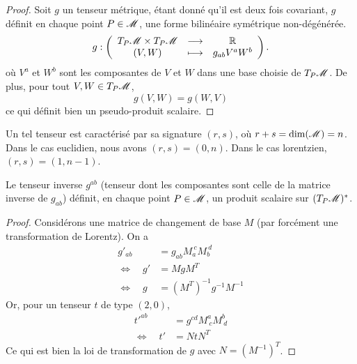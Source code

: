 \documentclass[a4paper,11pt]{report}
\begin{document}
                \begin{proof}
                    Soit $g$ un tenseur métrique, étant donné qu'il est deux fois covariant, $g$ définit en chaque point $P\in\mathscr{M}$, une forme bilinéaire symétrique non-dégénérée.
                \begin{equation}
                    g:\left(
                \begin{array}{ccc}
                    T_P\mathscr{M}\times T_P\mathscr{M} & \longrightarrow & \mathbb{R} \\
                    (V,W) & \longmapsto & g_{ab}V^a W^b
                \end{array}
                \right).
                \end{equation}
                où $V^a$ et $W^b$ sont les composantes de $V$ et $W$ dans une base choisie de $T_P\mathscr{M}$. De plus, pour tout $V,W\in T_P\mathscr{M}$,
                \begin{equation}
                    g(V,W) = g(W,V)
                \end{equation}
                ce qui définit bien un pseudo-produit scalaire.
                \end{proof}
                
                Un tel tenseur est caractérisé par sa signature $(r,s)$, où $r+s = \text{dim}(\mathscr{M}) = n$. Dans le cas euclidien, nous avons $(r,s) = (0,n)$. Dans le cas lorentzien, $(r,s) = (1,n-1)$.
                
                \begin{prop}\begin{leftbar}
                    Le tenseur inverse $g^{ab}$ (tenseur dont les composantes sont celle de la matrice inverse de $g_{ab}$) définit, en chaque point $P\in\mathscr{M}$, un produit scalaire sur $(T_P\mathscr{M})^*$.
                \end{leftbar}\end{prop}
                
                \begin{proof}
                    Considérons une matrice de changement de base $M$ (par forcément une transformation de Lorentz). On a
                    \begin{align}
                        g'_{ab} &= g_{ab}M_{a}^{~c}M_{b}^{~d}\\
                        \Leftrightarrow \quad g'&= MgM^T \\
                        \Leftrightarrow \quad g &= (M^T)^{-1}g^{-1}M^{-1}
                    \end{align}
                    Or, pour un tenseur $t$ de type $(2,0)$,
                    \begin{align}
                        t'^{ab} &= g^{cd}M^{a}_{~c}M^{b}_{~d}\\
                        \Leftrightarrow \quad t'&= NtN^T
                    \end{align}
                    Ce qui est bien la loi de transformation de $g$ avec $N = (M^{-1})^T$.
                \end{proof}
                
\end{document}
